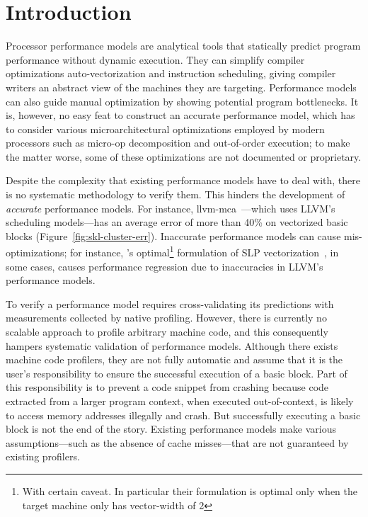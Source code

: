\section{Introduction}
Processor performance models are analytical tools that statically predict
program performance without dynamic execution.
They can simplify compiler optimizations
auto-vectorization and instruction scheduling,
giving compiler writers an abstract view of the machines they are targeting.
Performance models can also guide manual optimization by showing
potential program bottlenecks.
It is, however, no easy feat to construct an accurate performance model,
which has to consider various microarchitectural optimizations employed by
modern processors such as micro-op decomposition and out-of-order execution;
to make the matter worse, some of these optimizations 
are not documented or proprietary.

Despite the complexity that existing performance models have to deal with,
there is no systematic methodology to verify them. 
This hinders the development of \emph{accurate} performance models.
For instance, llvm-mca~\cite{llvm-mca}---which uses 
LLVM's scheduling models---has an average error of more than 40\% on vectorized
basic blocks (Figure~\ref{fig:skl-cluster-err}).
Inaccurate performance models can cause mis-optimizations;
for instance, \cite{goslp}'s optimal\footnote{
With certain caveat.
In particular their formulation is optimal only when the target machine only has vector-width of 2} 
formulation of SLP vectorization~\cite{slp},
in some cases, causes performance regression due to inaccuracies in LLVM's~\cite{llvm} performance models.


To verify a performance model
requires cross-validating its predictions with
measurements collected by native profiling.
However, there is currently no scalable approach 
to profile arbitrary machine code, and this consequently
hampers systematic validation of performance models.
Although there exists machine code profilers, 
they are not fully automatic and
assume that it is the user's responsibility to ensure
the successful execution of a basic block.
Part of this responsibility is to prevent a code snippet from crashing because 
code extracted from a larger program context, when executed
out-of-context, is likely to access memory addresses illegally and crash.
But successfully executing a basic block is not the end of the story.
Existing performance models make various assumptions---such as the absence of
cache misses---that are not guaranteed by existing profilers.

